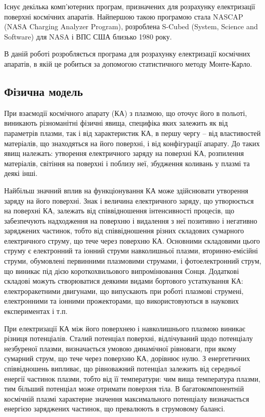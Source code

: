 \documentclass[a4paper,12pt]{article}
\begin{document}
Існує декілька комп’ютерних програм, призначених для розрахунку електризації поверхні космічних апаратів. Найпершою такою програмою стала NASCAP (NASA Charging Analyzer Program), розроблена S-Cubed (System, Science and Software) для NASA і ВПС США близько 1980 року.

В даній роботі розробляється програма для розрахунку електризації космічних апаратів, в якій це робиться за допомогою статистичного методу Монте-Карло.

\subsection{Фізична модель}
При взаємодії космічного апарату (КА) з плазмою, що оточує його в польоті, виникають різноманітні фізичні явища, специфіка яких залежить як від параметрів плазми, так і від характеристик КА, в першу чергу -- від властивостей матеріалів, що знаходяться на його поверхні, і від конфігурації апарату. До таких явищ належать: утворення електричного заряду на поверхні КА, розпилення матеріалів, світіння на поверхні і поблизу неї, збудження коливань у плазмі та деякі інші.

Найбільш значний вплив на функціонування КА може здійснювати утворення заряду на його поверхні. Знак і величина електричного заряду, що утворюється на поверхні КА, залежать від співвідношення інтенсивності процесів, що забезпечують надходження на поверхню і видалення з неї позитивно і негативно заряджених частинок, тобто від співвідношення різних складових сумарного електричного струму, що тече через поверхню КА. Основними складовими цього струму є електронний та іонний струми навколишньої плазми, вторинно-емісійні струми, обумовлені первинними плазмовими струмами, і фотоелектронний струм, що виникає під дією короткохвильового випромінювання Сонця. Додаткові складові можуть створюватися деякими видами бортового устаткування КА: електроракетними двигунами, що випускають при роботі плазмові струмені, електронними та іонними прожекторами, що використовуються в наукових експериментах і т.п.

При електризації КА між його поверхнею і навколишнього плазмою виникає різниця потенціалів. Сталий потенціал поверхні, відлічуваний щодо потенціалу незбуреної плазми, визначається умовою динамічної рівноваги, при якому сумарний струм, що тече через поверхню КА, дорівнює нулю. З енергетичних співвідношень випливає, що рівноважний потенціал залежить від середньої енергії частинок плазми, тобто від її температури: чим вища температура плазми, тим більший потенціал може отримати поверхня тіла. В багатокомпонентній космічній плазмі характерне значення максимального потенціалу визначається енергією заряджених частинок, що превалюють в струмовому балансі.
\end{document}
